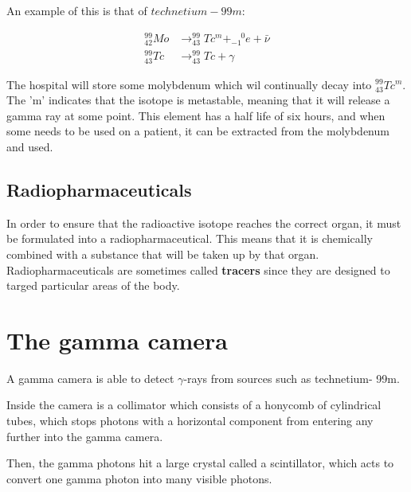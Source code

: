 \documentclass{article}
\begin{document}
An example of this is that of $technetium-99m$:

\[
	\begin{split}
		^{99}_{42}Mo &\rightarrow ^{99}_{43}Tc^{m} + ^{\phantom{-}0}_{-1}e + \bar{\nu}\\
		^{99}_{43}Tc &\rightarrow ^{99}_{43}Tc + \gamma
	\end{split}
\]

The hospital will store some molybdenum which wil continually decay into
$^{99}_{43}Tc^{m}$. The 'm' indicates that the isotope is metastable, meaning
that it will release a gamma ray at some point. This element has a half life of
six hours, and when some needs to be used on a patient, it can be extracted from
the molybdenum and used.

\subsection{Radiopharmaceuticals}

In order to ensure that the radioactive isotope reaches the correct organ, it
must be formulated into a radiopharmaceutical. This means that it is chemically
combined with a substance that will be taken up by that organ.
Radiopharmaceuticals are sometimes called {\bf tracers} since they are designed
to targed particular areas of the body.

\section{The gamma camera}

A gamma camera is able to detect $\gamma$-rays from sources such as technetium-
99m.

Inside the camera is a collimator which consists of a honycomb of cylindrical
tubes, which stops photons with a horizontal component from entering any further
into the gamma camera.

Then, the gamma photons hit a large crystal called a scintillator, which acts to
convert one gamma photon into many visible photons.
\end{document}
